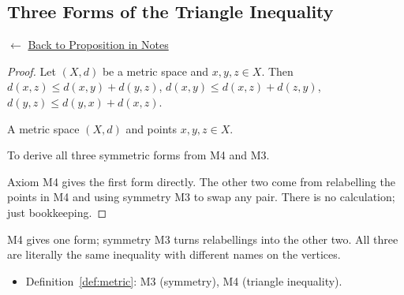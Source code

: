 
\subsection*{Three Forms of the Triangle Inequality}
\label{prf:triangle-three-forms}

\begin{remark*}[Return]
$\leftarrow$ \hyperref[prop:triangle-three-forms]{Back to Proposition in Notes}
\end{remark*}

\begin{proof}
\Claim Let $(X,d)$ be a metric space and $x,y,z \in X$.
Then $d(x,z) \le d(x,y)+d(y,z)$, \;
$d(x,y) \le d(x,z)+d(z,y)$, \;
$d(y,z) \le d(y,x)+d(x,z)$.

\Given A metric space $(X,d)$ and points $x,y,z \in X$.

\Goal To derive all three symmetric forms from M4 and M3.

\Strategy Axiom M4 gives the first form directly.
The other two come from relabelling the points in M4 and
using symmetry M3 to swap any pair.
There is no calculation; just bookkeeping.


\end{proof}

\begin{remark*}
M4 gives one form; symmetry M3 turns relabellings into the other two.
All three are literally the same inequality with different names on the vertices.
\end{remark*}

\begin{remark*}[Dependencies]
\begin{itemize}
  \item Definition~\ref{def:metric}: M3 (symmetry), M4 (triangle inequality).
\end{itemize}
\end{remark*}

